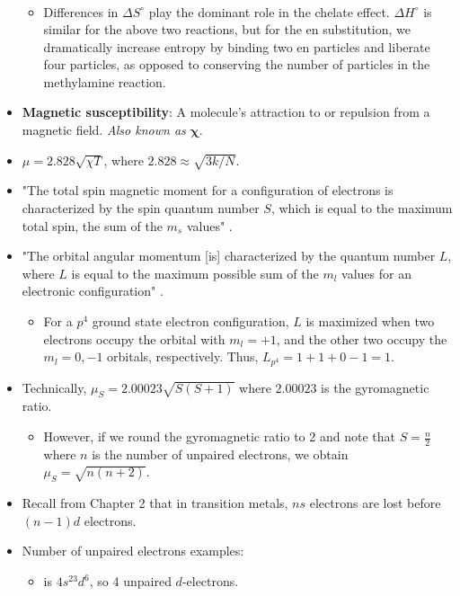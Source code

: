 \documentclass[../notes.tex]{subfiles}
\begin{document}
\begin{itemize}
\begin{gather*}
    \end{gather*}
    \begin{itemize}
        \item Differences in $\Delta S^\circ$ play the dominant role in the chelate effect. $\Delta H^\circ$ is similar for the above two reactions, but for the en substitution, we dramatically increase entropy by binding two en particles and liberate four  particles, as opposed to conserving the number of particles in the methylamine reaction.
    \end{itemize}
    \item \textbf{Magnetic susceptibility}: A molecule's attraction to or repulsion from a magnetic field. \emph{Also known as} $\bm{\chi}$.
    \item $\mu=2.828\sqrt{\chi T}$, where $2.828\approx\sqrt{3k/N}$.
    \item "The total spin magnetic moment for a configuration of electrons is characterized by the spin quantum number $S$, which is equal to the maximum total spin, the sum of the $m_s$ values" \parencite[360]{bib:MiesslerFischerTarr}.
    \item "The orbital angular momentum [is] characterized by the quantum number $L$, where $L$ is equal to the maximum possible sum of the $m_l$ values for an electronic configuration" \parencite[360]{bib:MiesslerFischerTarr}.
    \begin{itemize}
        \item For a $p^4$ ground state electron configuration, $L$ is maximized when two electrons occupy the orbital with $m_l=+1$, and the other two occupy the $m_l=0,-1$ orbitals, respectively. Thus, $L_{p^4}=1+1+0-1=1$.
    \end{itemize}
    \item Technically, $\mu_S=2.00023\sqrt{S(S+1)}$ where $2.00023$ is the gyromagnetic ratio.
    \begin{itemize}
        \item However, if we round the gyromagnetic ratio to 2 and note that $S=\frac{n}{2}$ where $n$ is the number of unpaired electrons, we obtain $\mu_S=\sqrt{n(n+2)}$.
    \end{itemize}
    \item Recall from Chapter 2 that in transition metals, $ns$ electrons are lost before $(n-1)d$ electrons.
    \item Number of unpaired electrons examples:
    \begin{itemize}
        \item {} is $4s^23d^6$, so 4 unpaired $d$-electrons.

\end{itemize}
\end{itemize}
\end{document}
